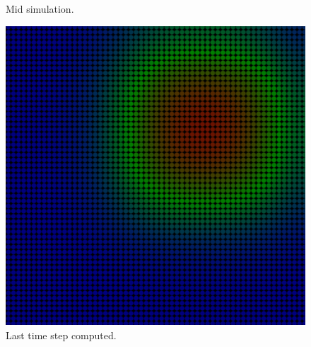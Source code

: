 \documentclass[xcolor=dvipsnames,10pt,aspectratio=169]{beamer}
\begin{document}
\begin{frame}
\begin{minipage}[h!]{0.30\textwidth}
\begin{figure}[h!]
			\caption{Mid simulation.}
		\end{figure}
	\end{minipage}
	\begin{minipage}[h!]{0.30\textwidth}
		\begin{figure}[h!]
			\centering
			\includegraphics[trim = {1cm 1cm 1cm 1cm}, clip , angle=0, scale=0.3]{figuras/sucesso_velocidade_3}
			\caption{Last time step computed.}
		\end{figure}
	\end{minipage}
\end{frame}
\end{document}
